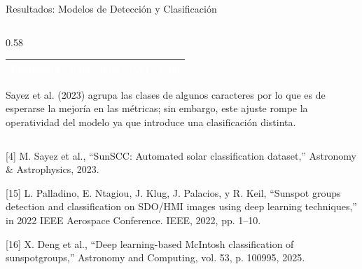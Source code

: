 \documentclass[aspectratio=169]{beamer}
\begin{document}
\begin{frame}{Resultados: Modelos de Detección y Clasificación}
\begin{columns}[c, onlytextwidth]
\begin{column}{0.58\textwidth}
\begin{table}
\begin{tabular}{lcccc}
                    \cellcolor{llamativoMagenta}\textcolor{white}{\textbf{Propuesta}} & 
                    \cellcolor{llamativoMagenta}\textcolor{white}{\textbf{0.65}} & 
                    \cellcolor{llamativoMagenta}\textcolor{white}{\textbf{0.63}} & 
                    \cellcolor{llamativoMagenta}\textcolor{white}{\textbf{0.71}} & 
                    \cellcolor{llamativoMagenta}\textcolor{white}{\textbf{0.66}} \\
                    \bottomrule
                \end{tabular}
            \end{table}

            \vspace{0.15cm}

            \scriptsize
            Sayez et al. (2023) agrupa las clases de algunos caracteres por lo que es de esperarse la mejoría en las métricas; sin embargo, este ajuste rompe la operatividad del modelo ya que introduce una clasificación distinta.
            
        \end{column}
        
    \end{columns}

    \vfill

    {\tiny\color{gray}
    [4] M. Sayez et al., “SunSCC: Automated solar classification dataset,” Astronomy \& Astrophysics, 2023. \par\vspace{0.03cm}
    [15] L. Palladino, E. Ntagiou, J. Klug, J. Palacios, y R. Keil, “Sunspot groups detection and classification on SDO/HMI images using deep learning techniques,” in 2022 IEEE Aerospace Conference. IEEE, 2022, pp. 1–10. \par\vspace{0.03cm}
    [16] X. Deng et al., “Deep learning-based McIntosh classification of sunspotgroups,” Astronomy and Computing, vol. 53, p. 100995, 2025.\par}
\end{frame}
\end{document}
